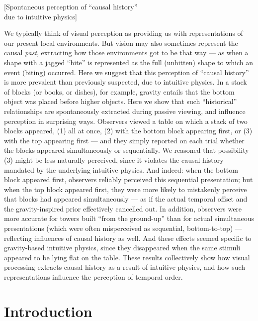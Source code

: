 [Spontaneous perception of ``causal history'' \\due to intuitive physics]
\label{chap:casual_hist}

We typically think of visual perception as providing us with representations of our present local environments.  But vision may also sometimes represent the causal \textit{past}, extracting how those environments got to be that way --- as when a shape with a jagged ``bite'' is represented as the full (unbitten) shape to which an event (biting) occurred.  Here we suggest that this perception of ``causal history'' is more prevalent than previously suspected, due to intuitive physics.  In a stack of blocks (or books, or dishes), for example, gravity entails that the bottom object was placed before higher objects.  Here we show that such ``historical'' relationships are spontaneously extracted during passive viewing, and influence perception in surprising ways.  Observers viewed a table on which a stack of two blocks appeared, (1) all at once, (2) with the bottom block appearing first, or (3) with the top appearing first --- and they simply reported on each trial whether the blocks appeared simultaneously or sequentially.  We reasoned that possibility (3) might be less naturally perceived, since it violates the causal history mandated by the underlying intuitive physics.  And indeed: when the bottom block appeared first, observers reliably perceived this sequential presentation; but when the top block appeared first, they were more likely to mistakenly perceive that blocks had appeared simultaneously --- as if the actual temporal offset and the gravity-inspired prior effectively cancelled out.  In addition, observers were more accurate for towers built ``from the ground-up'' than for actual simultaneous presentations (which were often misperceived as sequential, bottom-to-top) --- reflecting influences of causal history as well.  And these effects seemed specific to gravity-based intuitive physics, since they disappeared when the same stimuli appeared to be lying flat on the table.  These results collectively show how visual processing extracts causal history as a result of intuitive physics, and how such representations influence the perception of temporal order.

\section{Introduction}


